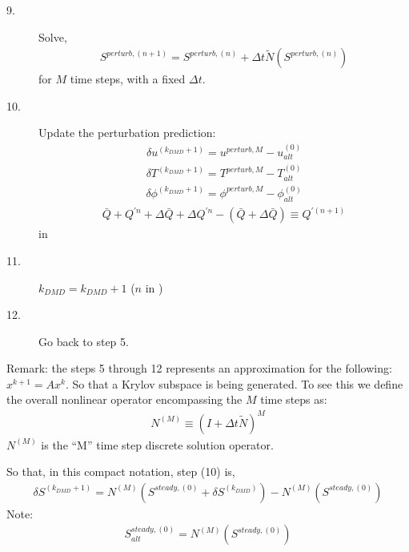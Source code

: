\documentclass[]{article}
\begin{document}
\begin{description}
        \item[9.] Solve,
        \begin{eqnarray}
		S^{perturb,(n+1)}=S^{perturb,(n)}+
		\Delta t \tilde{N}(S^{perturb,(n)}) 
           \label{perturb_discrete}
        \end{eqnarray}
        for $M$ time steps, with a fixed $\Delta t$.
        \item[10.] Update the perturbation prediction:
                \begin{eqnarray}
                \delta u^{(k_{DMD}+1)}=u^{perturb,M}-u_{alt}^{(0)}
                \end{eqnarray}
                \begin{eqnarray}
                \delta T^{(k_{DMD}+1)}=T^{perturb,M}-T_{alt}^{(0)}
                \end{eqnarray}
                \begin{eqnarray}
                \delta \phi^{(k_{DMD}+1)}=\phi^{perturb,M}-\phi_{alt}^{(0)}
                \end{eqnarray}
                \begin{eqnarray}
                \bar{Q}+Q^{\prime n}+\Delta\bar{Q}+\Delta Q^{\prime n}-
                (\bar{Q}+\Delta\bar{Q})\equiv Q^{\prime(n+1)}
                \end{eqnarray}
                in \cite{RANJAN2020109076}
        \item[11.] $k_{DMD}=k_{DMD}+1$
           ($n$ in \cite{RANJAN2020109076})
        \item[12.] Go back to step 5.

\end{description}
Remark: the steps 5 through 12
represents an approximation for the following:
$x^{k+1}=A x^{k}$.  So that a Krylov subspace is being generated.
To see this 
we define the overall 
nonlinear operator encompassing the $M$ time steps as:
\begin{eqnarray}
	N^{(M)}\equiv (I+\Delta t \tilde{N})^{M}
\end{eqnarray}
$N^{(M)}$ is the ``M'' time step discrete solution operator.
\par\noindent
So that, in this compact notation, step (10) is,
\begin{eqnarray}
	\delta S^{(k_{DMD}+1)}=
	N^{(M)}(S^{steady,(0)}+
	\delta S^{(k_{DMD})})-
	N^{(M)}(S^{steady,(0)})
\end{eqnarray}
Note:
\begin{eqnarray}
S_{alt}^{steady,(0)}=N^{(M)}(S^{steady,(0)})
\end{eqnarray}
\end{document}
